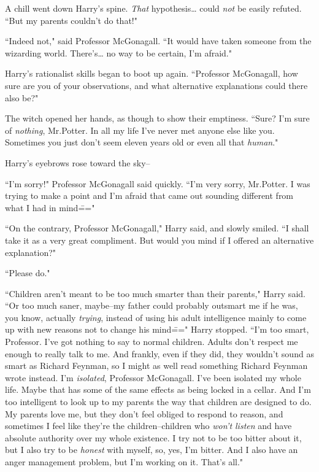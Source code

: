 A chill went down Harry's spine. \emph{That} hypothesis{\ldots} could \emph{not} be easily refuted. ``But my parents couldn't do that!"

``Indeed not," said Professor McGonagall. ``It would have taken someone from the wizarding world. There's{\ldots} no way to be certain, I'm afraid."

Harry's rationalist skills began to boot up again. ``Professor McGonagall, how sure are you of your observations, and what alternative explanations could there also be?"

The witch opened her hands, as though to show their emptiness. ``Sure? I'm sure of \emph{nothing}, Mr.\?Potter. In all my life I've never met anyone else like you. Sometimes you just don't seem eleven years old or even all that \emph{human}."

Harry's eyebrows rose toward the sky\---

``I'm sorry!" Professor McGonagall said quickly. ``I'm very sorry, Mr.\?Potter. I was trying to make a point and I'm afraid that came out sounding different from what I had in mind\==="

``On the contrary, Professor McGonagall," Harry said, and slowly smiled. ``I shall take it as a very great compliment. But would you mind if I offered an alternative explanation?"

``Please do."

``Children aren't meant to be too much smarter than their parents," Harry said. ``Or too much saner, maybe\---my father could probably outsmart me if he was, you know, actually \emph{trying}, instead of using his adult intelligence mainly to come up with new reasons not to change his mind\===" Harry stopped. ``I'm too smart, Professor. I've got nothing to say to normal children. Adults don't respect me enough to really talk to me. And frankly, even if they did, they wouldn't sound as smart as Richard Feynman, so I might as well read something Richard Feynman wrote instead. I'm \emph{isolated}, Professor McGonagall. I've been isolated my whole life. Maybe that has some of the same effects as being locked in a cellar. And I'm too intelligent to look up to my parents the way that children are designed to do. My parents love me, but they don't feel obliged to respond to reason, and sometimes I feel like they're the children\---children who \emph{won't listen} and have absolute authority over my whole existence. I try not to be too bitter about it, but I also try to be \emph{honest} with myself, so, yes, I'm bitter. And I also have an anger management problem, but I'm working on it. That's all."

